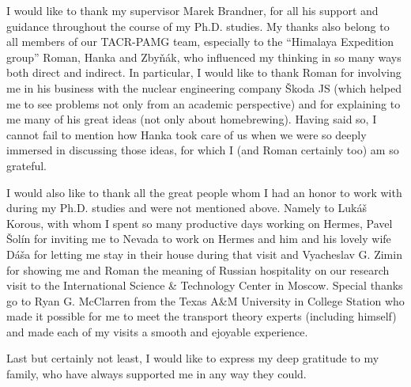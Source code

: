 

\begin{acknowledgements}      %

I would like to thank my supervisor Marek Brandner, for all his support and guidance throughout the course of 
my Ph.D. studies. My thanks also belong to all members of our TACR-PAMG team, especially to the ``Himalaya
Expedition group'' Roman, Hanka and Zby{\v n}{\' a}k, who influenced my thinking in so many ways both direct and
indirect. In particular, I would like to thank Roman for involving me in his business with the nuclear
engineering company {\v S}koda JS (which helped me to see problems not only from an academic perspective) and for
explaining to me many of his great ideas (not only about homebrewing). Having said so, I cannot fail to mention how 
Hanka took care of us when we were so deeply immersed in discussing those ideas, for which I (and Roman certainly too)
am so grateful.

I would also like to thank all the great people whom I had an honor to work with during my Ph.D. studies and were
not mentioned above. Namely to Luk{\' a}{\v s} Korous, with whom I spent so many productive days working on Hermes,
Pavel {\v S}ol{\' i}n for inviting me to Nevada to work on Hermes and him and his lovely wife D{\' a}{\v s}a for
letting me stay in their house during that visit and Vyacheslav G. Zimin for
showing me and Roman the meaning of Russian hospitality on our research visit to the International Science \& Technology
Center in Moscow. Special thanks go to Ryan G. McClarren from the Texas A\&M University in College Station who made it
possible for me to meet the transport theory experts (including himself) and made each of my visits a smooth and
ejoyable experience.

Last but certainly not least, I would like to express my deep gratitude to my family, who have always supported me in
any way they could.

\end{acknowledgements}



